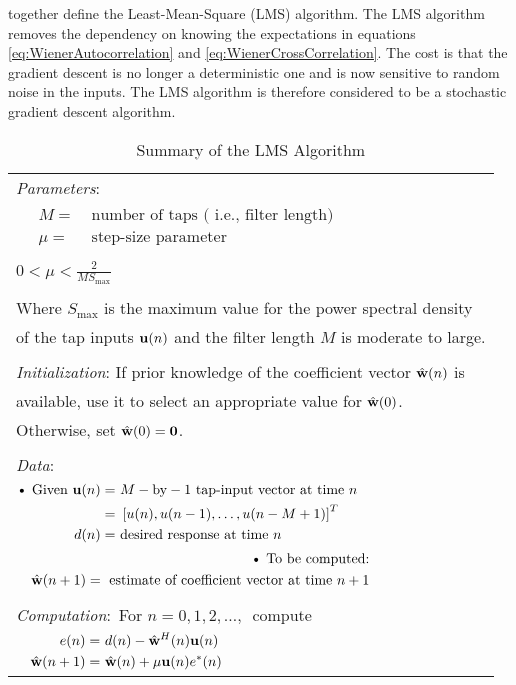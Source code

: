together define the Least-Mean-Square (LMS) algorithm. %
The LMS algorithm removes the dependency on knowing the %
expectations in equations \ref{eq:WienerAutocorrelation} %
and \ref{eq:WienerCrossCorrelation}. The cost is that %
the gradient descent is no longer a deterministic one %
and is now sensitive to random noise in the inputs. The LMS %
algorithm is therefore considered to be a stochastic gradient %
descent algorithm.
\begin{table}[ht]
	\centering
	\begin{tabular}{l}
		\hline
		\emph{Parameters}: \\
		$\begin{aligned}
			\quad M =&~\text{number of taps (
			i.e., filter length)}\\
			\quad \mu =&~\text{step-size 
			parameter}
		\end{aligned}$\\
		\\
		$0 < \mu < \frac{2}{MS_{\text{max}}}$\\
		\\
		Where $S_{\text{max}}$ is the maximum
		value for the power spectral density\\
		of the tap inputs $\bold{u}(n)$ and the filter
		length $M$ is moderate to large.\\
		\\
		\emph{Initialization}: If prior
		knowledge of the coefficient vector 
		$\hat{\bold{w}}(n)$ is \\available, use 
		it to select an appropriate value for 
		$\hat{\bold{w}}(0)$. \\Otherwise, set 
		$\hat{\bold{w}}(0) = \bold{0}$.\\
		\\
		\emph{Data}: \\
		$\begin{aligned}
			\text{\textbullet}~
			\text{Given } \bold{u}(n) =&~
			M-\text{by}-1~\text{tap-input 
			vector at time }n\\
			=&~\left[u(n),u(n-1),\ldots,
			u(n-M+1)\right]^{T}\\
			d(n) =&~\text{desired response
			at time }n
		\end{aligned}$\\
		$\begin{aligned}
			\text{\textbullet}~
			\text{To be computed:}\\
			\quad\hat{\bold{w}}(n+1)=~
			\text{estimate of coefficient vector
			at time }n+1
		\end{aligned}$\\
		\\
		\emph{Computation}:~For $n=0,1,2,\ldots,$~compute\\
		$\begin{aligned}
			\quad e(n)=&~d(n) - \hat{\bold{w}}^{H}(n)
			\bold{u}(n)\\
			\quad \hat{\bold{w}}(n+1) =&~ 
			\hat{\bold{w}}(n) + \mu\bold{u}(n)e
			^{*}(n)
		\end{aligned}$\\
		\hline
	\end{tabular}
	\caption{Summary of the LMS Algorithm \cite{Hay02}}
	\label{tab:LMS}
\end{table}
\FloatBarrier

